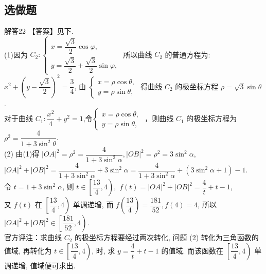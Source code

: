 \documentclass[11pt]{article}
\begin{document}
\subsection{选做题}
\heiti 解答22 \songti 【答案】见下.
\\(1)因为 $C_{2}:\left\{\begin{array}{l}x=\dfrac{\sqrt{3}}{2} \cos \varphi, \\ y=\dfrac{\sqrt{3}}{2}+\dfrac{\sqrt{3}}{2} \sin \varphi,\end{array}\right.$ 
所以曲线 $C_{2}$ 的普通方程为: $x^{2}+\left(y-\dfrac{\sqrt{3}}{2}\right)^{2}=\dfrac{3}{4}$, 由 $\left\{\begin{array}{l}x=\rho \cos \theta, \\ y=\rho \sin \theta,\end{array}\right.$ 得曲线 $C_{2}$ 的极坐标方程 $\rho=\sqrt{3} \sin \theta$.
\\对于曲线 $C_{1}: \dfrac{x^{2}}{4}+y^{2}=1$,令$\left\{\begin{array}{l}x=\rho \cos \theta, \\ y=\rho \sin \theta,\end{array}\right.$ ，则曲线 $C_{1}$ 的极坐标方程为 $\rho^{2}=\dfrac{4}{1+3 \sin ^{2} \theta}$.
\\(2) 由(1)得 $|O A|^{2}=\rho^{2}=\dfrac{4}{1+3 \sin ^{2} \alpha},|O B|^{2}=\rho^{2}=3 \sin ^{2} \alpha$, 
\\$|O A|^{2}+|O B|^{2}=\dfrac{4}{1+3 \sin ^{2} \alpha}+3 \sin ^{2} \alpha=\dfrac{4}{1+3 \sin ^{2} \alpha}+\left(3 \sin ^{2} \alpha+1\right)-1 .$ 
\\令 $t=1+3 \sin ^{2} \alpha$, 则 $t \in\left[ \dfrac{13}{4},4\right ),$ $f(t)=|O A|^{2}+|O B|^{2}=\dfrac{4}{t}+t-1$, 
\\又 $f(t)$ 在 $\left[\dfrac{13}{4}, 4\right)$ 单调递增,
而 $f\left(\dfrac{13}{4}\right)=\dfrac{181}{52}, f(4)=4$, 所以 $|O A|^{2}+|O B|^{2} \in\left[\dfrac{181}{52}, 4\right)$.
\\ \heiti  官方评注：\songti 求曲线 $C_{2}$ 的极坐标方程要经过两次转化, 问题 (2) 转化为三角函数的值域, 再转化为 $t \in\left[\dfrac{13}{4}, 4\right)$, 时, 求 $y=\dfrac{4}{t}+t-1$ 的值域. 而该函数在 $\left[\dfrac{13}{4}, 4\right)$ 单调递增, 值域便可求出.
\end{document}
